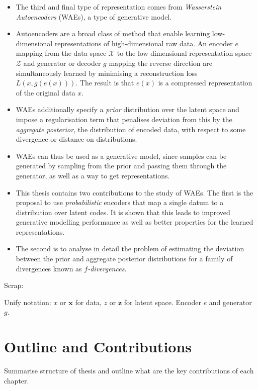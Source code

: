\begin{itemize}
\item The third and final type of representation comes from \emph{Wasserstein Autoencoders} (WAEs), a type of generative model. 
\item Autoencoders are a broad class of method that enable learning low-dimensional representations of high-dimensional raw data. An encoder $e$ mapping from the data space $\mathcal{X}$ to the low dimensional representation space $\mathcal{Z}$ and generator or decoder $g$ mapping the reverse direction are simultaneously learned by minimising a reconstruction loss $L\left(x, g(e(x))\right)$. The result is that $e(x)$ is a compressed representation of the original data $x$. 
\item WAEs additionally specify a \emph{prior} distribution over the latent space and impose a regularisation term that penalises deviation from this by the \emph{aggregate posterior}, the distribution of encoded data, with respect to some divergence or distance on distributions.
\item WAEs can thus be used as a generative model, since samples can be generated by sampling from the prior and passing them through the generator, as well as a way to get representations.
\item This thesis contains two contributions to the study of WAEs. The first is the proposal to use \emph{probabilistic} encoders that map a single datum to a distribution over latent codes. It is shown that this leads to improved generative modelling performance as well as better properties for the learned representations.
\item The second is to analyse in detail the problem of estimating the deviation between the prior and aggregate posterior distributions for a family of divergences known as \emph{$f$-divergences}.
\end{itemize}


Scrap:

Unify notation: $x$ or $\mathbf{x}$ for data, $z$ or $\mathbf{z}$ for latent space. Encoder $e$ and generator $g$. 



\section{Outline and Contributions}

Summarise structure of thesis and outline what are the key contributions of each chapter.

